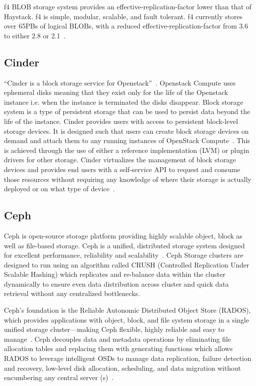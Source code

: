 {     f4 BLOB storage system provides an effective-replication-factor
     lower than that of Haystack. f4 is simple, modular, scalable, and
     fault tolerant. f4 currently stores over 65PBs of logical BLOBs,
     with a reduced effective-replication-factor from 3.6 to either
     2.8 or 2.1~\cite{paper-f4}.

     
\subsection{Cinder}
      
``Cinder is a block storage service for
Openstack''~\cite{wiki-Cinder}. Openstack Compute uses ephemeral disks
meaning that they exist only for the life of the Openstack instance
i.e. when the instance is terminated the disks disappear. Block
storage system is a type of persistent storage that can be used to
persist data beyond the life of the instance. Cinder provides users
with access to persistent block-level storage devices. It is designed
such that users can create block storage devices on demand and attach
them to any running instances of OpenStack
Compute~\cite{book-Cinder}. This is achieved through the use of either
a reference implementation (LVM) or plugin drivers for other
storage. Cinder virtualizes the management of block storage devices
and provides end users with a self-service API to request and consume
those resources without requiring any knowledge of where their storage
is actually deployed or on what type of device~\cite{wiki-Cinder}.
     
\subsection{Ceph }

Ceph is open-source storage platform providing highly scalable object,
block as well as file-based storage. Ceph is a unified, distributed
storage system designed for excellent performance, reliability and
scalability~\cite{www-ceph}. Ceph Storage clusters are designed to run
using an algorithm called CRUSH (Controlled Replication Under Scalable
Hashing) which replicates and re-balance data within the cluster
dynamically to ensure even data distribution across cluster and quick
data retrieval without any centralized bottlenecks.
 
Ceph’s foundation is the Reliable Autonomic Distributed Object Store
(RADOS), which provides applications with object, block, and file
system storage in a single unified storage cluster—making Ceph
flexible, highly reliable and easy to manage~\cite{www-cepharch}. Ceph
decouples data and metadata operations by eliminating file allocation
tables and replacing them with generating functions which allows RADOS
to leverage intelligent OSDs to manage data replication, failure
detection and recovery, low-level disk allocation, scheduling, and
data migration without encumbering any central server
(s)~\cite{paper-Ceph}.
 
}

